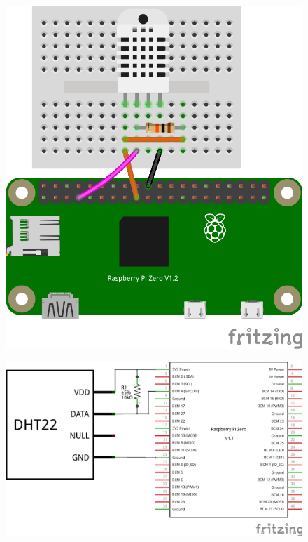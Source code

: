 

\begin{figure}[ht]
  \centering
  \includegraphics[scale=1.0, angle=-90]{images/DHT22_Steckplatine.png}	
  \label{DHT22_Steckplatine}
\end{figure}


\begin{figure}[ht]
	\centering
	\includegraphics[scale=0.25]{images/DHT22_Schaltplan.png}	
	\label{DHT22_Steckplatine}
\end{figure}

